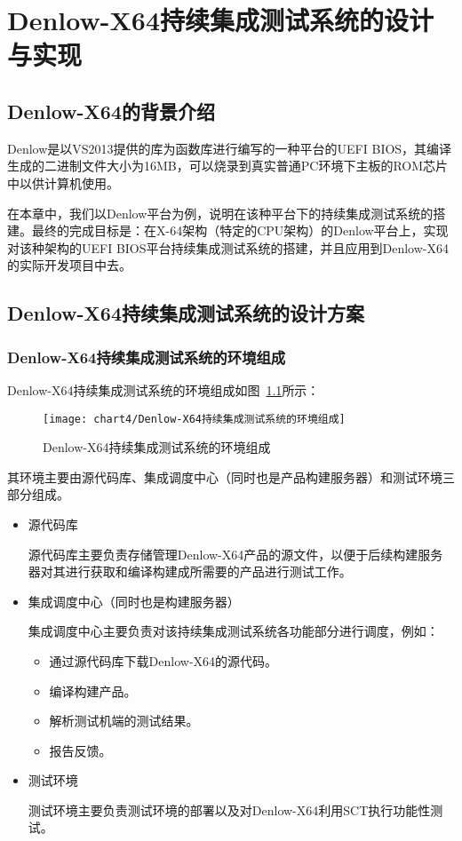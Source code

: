 \chapter{Denlow-X64持续集成测试系统的设计与实现}
\label{cha:intro}

\section{Denlow-X64的背景介绍}

Denlow是以VS2013提供的库为函数库进行编写的一种平台的UEFI BIOS，其编译生成的二进制文件大小为16MB，可以烧录到真实普通PC环境下主板的ROM芯片中以供计算机使用。

在本章中，我们以Denlow平台为例，说明在该种平台下的持续集成测试系统的搭建。最终的完成目标是：在X-64架构（特定的CPU架构）的Denlow平台上，实现对该种架构的UEFI BIOS平台持续集成测试系统的搭建，并且应用到Denlow-X64的实际开发项目中去。

\section{Denlow-X64持续集成测试系统的设计方案}
	\subsection{Denlow-X64持续集成测试系统的环境组成}
		
		Denlow-X64持续集成测试系统的环境组成如图~\ref{fig:Denlow-X64持续集成测试系统的环境组成}所示：
		
		\begin{figure}[H] %
			\centering
			\texttt{[image: chart4/Denlow-X64持续集成测试系统的环境组成]}
			\caption{Denlow-X64持续集成测试系统的环境组成}
			\label{fig:Denlow-X64持续集成测试系统的环境组成}
		\end{figure}
		
		其环境主要由源代码库、集成调度中心（同时也是产品构建服务器）和测试环境三部分组成。
		
		\begin{itemize}
			\item 源代码库
			
				源代码库主要负责存储管理Denlow-X64产品的源文件，以便于后续构建服务器对其进行获取和编译构建成所需要的产品进行测试工作。
			\item 集成调度中心（同时也是构建服务器）
				
				集成调度中心主要负责对该持续集成测试系统各功能部分进行调度，例如：
					\begin{itemize}
						\item 通过源代码库下载Denlow-X64的源代码。
						\item 编译构建产品。
						\item 解析测试机端的测试结果。
						\item 报告反馈。
					\end{itemize}
			\item 测试环境
				
				测试环境主要负责测试环境的部署以及对Denlow-X64利用SCT执行功能性测试。
		\end{itemize}
	
